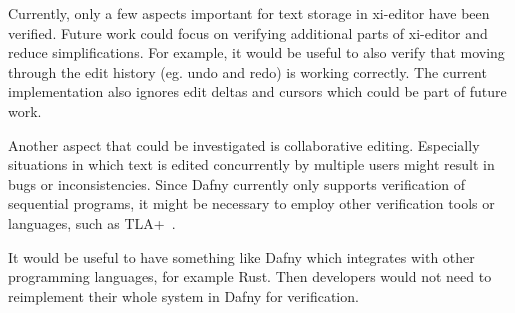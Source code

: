 Currently, only a few aspects important for text storage in xi-editor have been verified.
Future work could focus on verifying additional parts of xi-editor and reduce simplifications.
For example, it would be useful to also verify that moving through the edit history (eg. undo and redo) is working correctly.
The current implementation also ignores edit deltas and cursors which could be part of future work.

Another aspect that could be investigated is collaborative editing.
Especially situations in which text is edited concurrently by multiple users might result in bugs or inconsistencies.
Since Dafny currently only supports verification of sequential programs, it might be necessary to employ other verification tools or languages, such as TLA+~\cite{chaudhuri2010verifying}.

It would be useful to have something like Dafny which integrates with other programming languages, for example Rust.
Then developers would not need to reimplement their whole system in Dafny for verification.